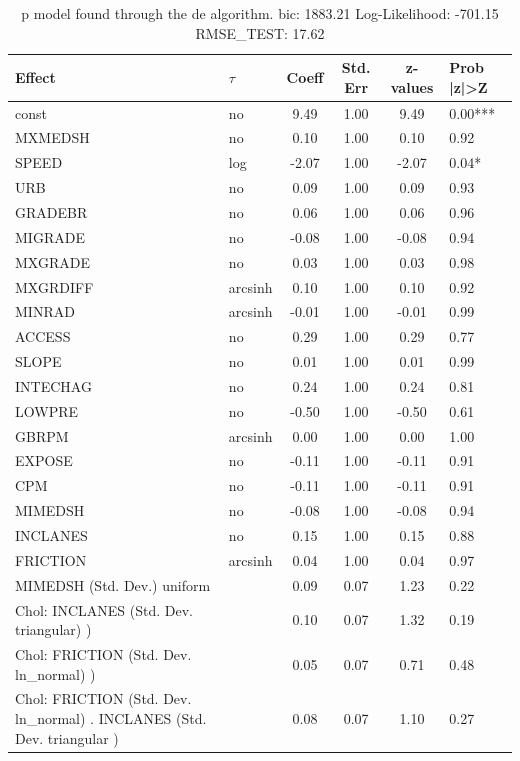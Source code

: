 \begin{table}
	\caption{p model found through the de algorithm. bic: 1883.21 Log-Likelihood: -701.15 RMSE_TEST: 17.62}
	\begin{center}
		\begin{tabular}{|l|l|c|c|c|l|}
			\hline
			Effect & $\tau$ & Coeff & Std. Err & z-values & Prob |z|>Z \\
			\hline
			const & no & 9.49 & 1.00 & 9.49 & 0.00*** \\
			\hline
			MXMEDSH & no & 0.10 & 1.00 & 0.10 & 0.92 \\
			\hline
			SPEED & log & -2.07 & 1.00 & -2.07 & 0.04* \\
			\hline
			URB & no & 0.09 & 1.00 & 0.09 & 0.93 \\
			\hline
			GRADEBR & no & 0.06 & 1.00 & 0.06 & 0.96 \\
			\hline
			MIGRADE & no & -0.08 & 1.00 & -0.08 & 0.94 \\
			\hline
			MXGRADE & no & 0.03 & 1.00 & 0.03 & 0.98 \\
			\hline
			MXGRDIFF & arcsinh & 0.10 & 1.00 & 0.10 & 0.92 \\
			\hline
			MINRAD & arcsinh & -0.01 & 1.00 & -0.01 & 0.99 \\
			\hline
			ACCESS & no & 0.29 & 1.00 & 0.29 & 0.77 \\
			\hline
			SLOPE & no & 0.01 & 1.00 & 0.01 & 0.99 \\
			\hline
			INTECHAG & no & 0.24 & 1.00 & 0.24 & 0.81 \\
			\hline
			LOWPRE & no & -0.50 & 1.00 & -0.50 & 0.61 \\
			\hline
			GBRPM & arcsinh & 0.00 & 1.00 & 0.00 & 1.00 \\
			\hline
			EXPOSE & no & -0.11 & 1.00 & -0.11 & 0.91 \\
			\hline
			CPM & no & -0.11 & 1.00 & -0.11 & 0.91 \\
			\hline
			MIMEDSH & no & -0.08 & 1.00 & -0.08 & 0.94 \\
			\hline
			INCLANES & no & 0.15 & 1.00 & 0.15 & 0.88 \\
			\hline
			FRICTION & arcsinh & 0.04 & 1.00 & 0.04 & 0.97 \\
			\hline
			MIMEDSH (Std. Dev.) uniform &  & 0.09 & 0.07 & 1.23 & 0.22 \\
			\hline
			 Chol: INCLANES (Std. Dev. triangular) ) &  & 0.10 & 0.07 & 1.32 & 0.19 \\
			\hline
			 Chol: FRICTION (Std. Dev. ln_normal) ) &  & 0.05 & 0.07 & 0.71 & 0.48 \\
			\hline
			 Chol: FRICTION (Std. Dev. ln_normal) . INCLANES (Std. Dev.   triangular ) &  & 0.08 & 0.07 & 1.10 & 0.27 \\
			\hline
		\end{tabular}
	\end{center}
\end{table}
